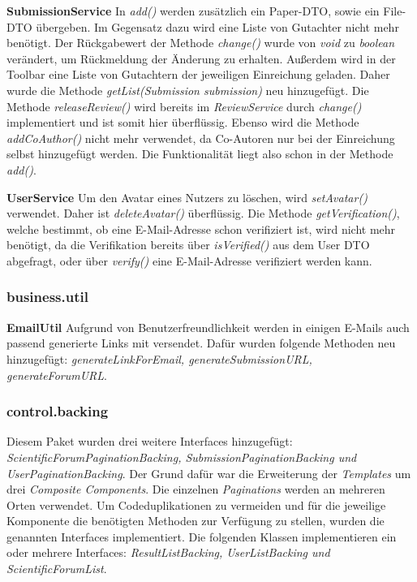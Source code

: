 \textbf{SubmissionService} In \emph{add()} werden zusätzlich ein Paper-DTO, sowie ein File-DTO übergeben. Im Gegensatz dazu wird eine Liste von Gutachter nicht mehr benötigt. \newline
Der Rückgabewert der Methode \emph{change()} wurde von \emph{void} zu \emph{boolean} verändert, um Rückmeldung der Änderung zu erhalten. \newline
Außerdem wird in der Toolbar eine Liste von Gutachtern der jeweiligen Einreichung geladen. Daher wurde die Methode \emph{getList(Submission submission)} neu hinzugefügt. \newline
Die Methode \emph{releaseReview()} wird bereits im \emph{ReviewService} durch \emph{change()} implementiert und ist somit hier überflüssig. \newline
Ebenso wird die Methode \emph{addCoAuthor()} nicht mehr verwendet, da Co-Autoren nur bei der Einreichung selbst hinzugefügt werden. Die Funktionalität liegt also schon in der Methode \emph{add()}.

\textbf{UserService} Um den Avatar eines Nutzers zu löschen, wird \emph{setAvatar()} verwendet. Daher ist \emph{deleteAvatar()} überflüssig. \newline
Die Methode \emph{getVerification()}, welche bestimmt, ob eine E-Mail-Adresse schon verifiziert ist, wird nicht mehr benötigt, da die Verifikation bereits über \emph{isVerified()} aus dem User DTO abgefragt, oder über \emph{verify()} eine E-Mail-Adresse verifiziert werden kann.

\subsubsection{business.util}

\textbf{EmailUtil} Aufgrund von Benutzerfreundlichkeit
werden in einigen E-Mails auch passend generierte Links mit versendet. Dafür wurden folgende Methoden neu hinzugefügt: \emph{generateLinkForEmail, generateSubmissionURL, generateForumURL}.

\subsubsection{control.backing}

Diesem Paket wurden drei weitere Interfaces hinzugefügt: \emph{ScientificForumPaginationBacking, SubmissionPaginationBacking und UserPaginationBacking}. Der Grund dafür war die Erweiterung der \emph{Templates} um drei \emph{Composite Components}. Die einzelnen \emph{Paginations} werden an mehreren Orten verwendet. Um Codeduplikationen zu vermeiden und für die jeweilige Komponente die benötigten Methoden zur Verfügung zu stellen, wurden die genannten Interfaces implementiert. Die folgenden Klassen implementieren ein oder mehrere Interfaces: \emph{ResultListBacking, UserListBacking und ScientificForumList}.

